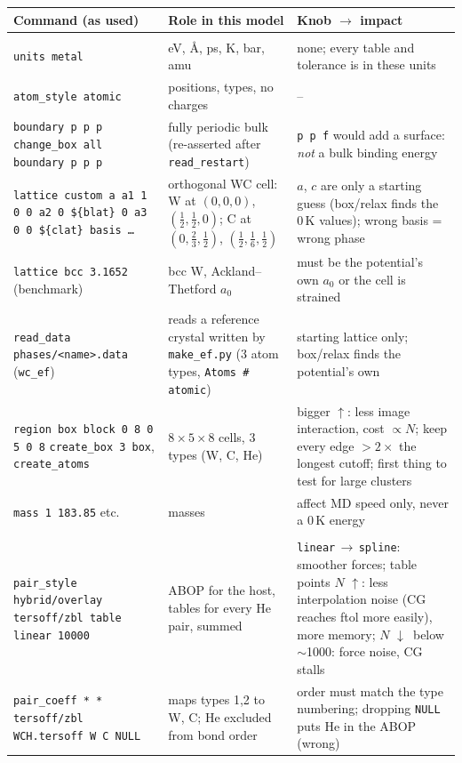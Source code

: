 \documentclass[10pt]{article}
\newcommand{\cmd}[1]{\texttt{\small #1}}
\newcommand{\up}{\textcolor{org}{$\uparrow$}}
\newcommand{\dn}{\textcolor{acc}{$\downarrow$}}
\begin{document}
\begin{xltabular}{\linewidth}{L{5.0cm} L{6.1cm} Y}
\toprule
\textbf{Command (as used)} & \textbf{Role in this model} & \textbf{Knob $\to$ impact} \\
\midrule\endhead
{} \\
\cmd{units metal} & eV, \AA, ps, K, bar, amu & none; every table and tolerance is in these units \\
\cmd{atom\_style atomic} & positions, types, no charges & -- \\
\cmd{boundary p p p} \newline \cmd{change\_box all boundary p p p} & fully periodic bulk (re-asserted after \cmd{read\_restart}) & \cmd{p p f} would add a surface: \emph{not} a bulk binding energy \\
\cmd{lattice custom a a1 1 0 0 a2 0 \$\{blat\} 0 a3 0 0 \$\{clat\} basis …} & orthogonal WC cell: W at $(0,0,0)$, $(\tfrac12,\tfrac12,0)$; C at $(0,\tfrac23,\tfrac12)$, $(\tfrac12,\tfrac16,\tfrac12)$ & $a$, $c$ are only a starting guess (box/relax finds the 0\,K values); wrong basis = wrong phase \\
\cmd{lattice bcc 3.1652} (benchmark) & bcc W, Ackland--Thetford $a_0$ & must be the potential's own $a_0$ or the cell is strained \\
\cmd{read\_data phases/<name>.data} (\cmd{wc\_ef}) & reads a reference crystal written by \cmd{make\_ef.py} (3 atom types, \cmd{Atoms \# atomic}) & starting lattice only; box/relax finds the potential's own \\
\cmd{region box block 0 8 0 5 0 8} \newline \cmd{create\_box 3 box}, \cmd{create\_atoms} & $8\times5\times8$ cells, 3 types (W, C, He) & bigger \up: less image interaction, cost $\propto N$; keep every edge $>2\times$ the longest cutoff; first thing to test for large clusters \\
\cmd{mass 1 183.85} etc. & masses & affect MD speed only, never a 0\,K energy \\
 \\
\cmd{pair\_style hybrid/overlay tersoff/zbl table linear 10000} & ABOP for the host, tables for every He pair, summed & \cmd{linear}\,$\to$\,\cmd{spline}: smoother forces; table points $N$ \up: less interpolation noise (CG reaches ftol more easily), more memory; $N$ \dn\ below $\sim$1000: force noise, CG stalls \\
\cmd{pair\_coeff * * tersoff/zbl WCH.tersoff W C NULL} & maps types 1,2 to W, C; He excluded from bond order & order must match the type numbering; dropping \cmd{NULL} puts He in the ABOP (wrong) \\

\end{xltabular}
\end{document}
